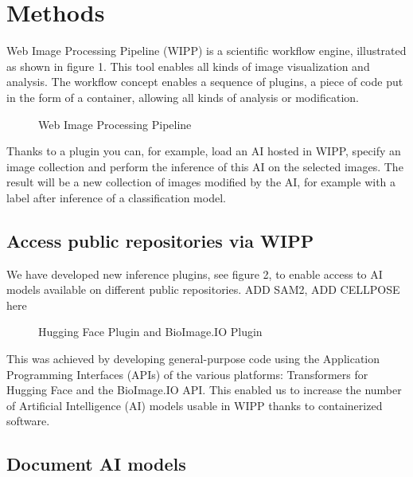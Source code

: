 \section{Methods}
\label{sec:methods}

Web Image Processing Pipeline (WIPP) is a scientific workflow engine,
illustrated as shown in figure 1. This tool enables all kinds of image
visualization and analysis. The workflow concept enables a sequence of plugins,
a piece of code put in the form of a container, allowing all kinds of analysis
or modification.

\begin{figure}[H]
  \centering
  \fbox{\rule{0pt}{2in} \rule{0.9\linewidth}{0pt}}

   \caption{Web Image Processing Pipeline}
   \label{fig:onecol}
\end{figure}

Thanks to a plugin you can, for example, load an AI hosted in WIPP, specify an
image collection and perform the inference of this AI on the selected images.
The result will be a new collection of images modified by the AI, for example
with a label after inference of a classification model.

\subsection{Access public repositories via WIPP}

We have developed new inference plugins, see figure 2, to enable access to AI
models available on different public repositories.
\TODO ADD SAM2, ADD CELLPOSE here

\begin{figure}[H]
  \centering
  \fbox{\rule{0pt}{2in} \rule{0.9\linewidth}{0pt}}

   \caption{Hugging Face Plugin and BioImage.IO Plugin}
   \label{fig:onecol}
\end{figure}

This was achieved by developing general-purpose code using the Application
Programming Interfaces (APIs) of the various platforms: Transformers for Hugging
Face and the BioImage.IO API. This enabled us to increase the number of
Artificial Intelligence (AI) models usable in WIPP thanks to containerized
software.

\subsection{Document AI models}

